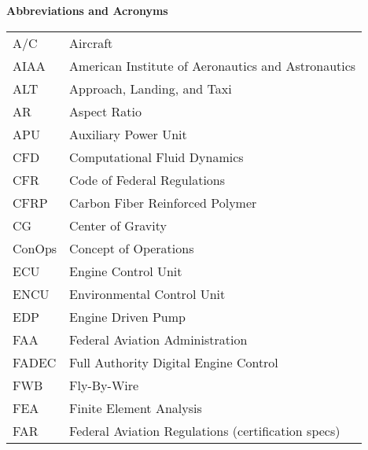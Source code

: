\hspace{-0.5in}\textbf{Abbreviations and Acronyms}
{\renewcommand\arraystretch{1.0}
\noindent\begin{longtable*}{@{}l @{\quad=\quad} l@{}}
    A/C & Aircraft \\
    AIAA & American Institute of Aeronautics and Astronautics \\
    ALT & Approach, Landing, and Taxi \\
    AR & Aspect Ratio \\
    APU & Auxiliary Power Unit \\
    CFD & Computational Fluid Dynamics \\
    CFR & Code of Federal Regulations \\
    CFRP & Carbon Fiber Reinforced Polymer \\
    CG & Center of Gravity \\
    ConOps & Concept of Operations \\
    ECU & Engine Control Unit \\
    ENCU & Environmental Control Unit \\ 
    EDP & Engine Driven Pump \\
    FAA & Federal Aviation Administration \\
    FADEC & Full Authority Digital Engine Control \\
    FWB & Fly-By-Wire \\
    FEA & Finite Element Analysis \\
    FAR & Federal Aviation Regulations (certification specs) \\

\end{longtable*}}
